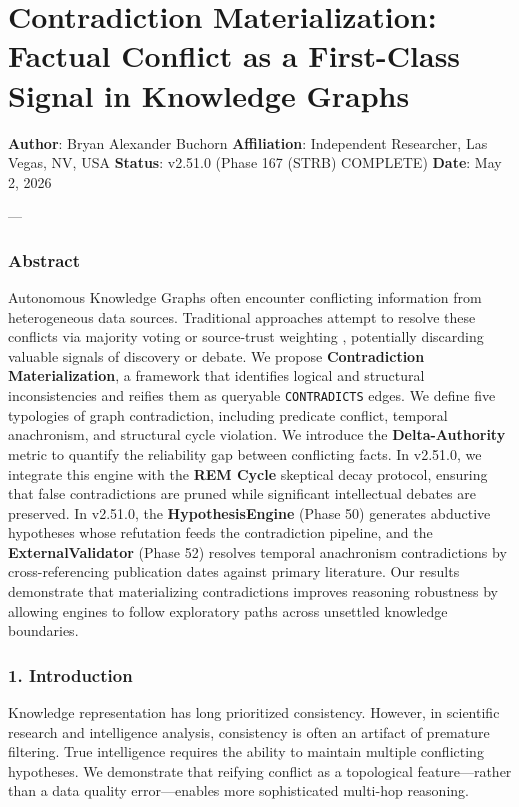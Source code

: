 \section{Contra\-diction Materi\-alization: Factual Conflict as a First-Class Signal in Knowledge Graphs}

\textbf{Author}: Bryan Alexander Buchorn  
\textbf{Affiliation}: Independent Researcher, Las Vegas, NV, USA  
\textbf{Status}: v2.51.0 (Phase 167 (STRB) COMPLETE)
\textbf{Date}: May 2, 2026

---

\subsubsection{Abstract}
Autonomous Knowledge Graphs often encounter conflicting information from heter\-ogeneous data sources. Traditional approaches attempt to resolve these conflicts via majority voting or source-trust weighting \cite{dong2014knowledgevault, bertossi2011database}, potentially discarding valuable signals of discovery or debate. We propose \textbf{Contra\-diction Materi\-alization}, a framework that identifies logical and structural incon\-sistencies and reifies them as queryable \texttt{CONTRADICTS} edges. We define five typologies of graph contr\-adiction, including predicate conflict, temporal anachronism, and structural cycle violation. We introduce the \textbf{Delta-Authority} metric to quantify the reliability gap between conflicting facts. In v2.51.0, we integrate this engine with the \textbf{REM Cycle} skeptical decay protocol, ensuring that false contr\-adictions are pruned while significant intel\-lectual debates are preserved. In v2.51.0, the \textbf{HypothesisEngine} (Phase 50) generates abductive hypotheses whose refutation feeds the contr\-adiction pipeline, and the \textbf{ExternalValidator} (Phase 52) resolves temporal anachronism contr\-adictions by cross-referencing publication dates against primary literature. Our results demonstrate that mater\-ializing contr\-adictions improves reasoning robustness by allowing engines to follow exploratory paths across unsettled knowledge boundaries.

\subsubsection{1. Introd\-uction}
Knowledge repre\-sentation has long prioritized consistency. However, in scientific research and intel\-ligence analysis, consistency is often an artifact of premature filtering. True intel\-ligence requires the ability to maintain multiple conflicting hypotheses. We demonstrate that reifying conflict as a topological feature—rather than a data quality error—enables more sophi\-sticated multi-hop reasoning.


